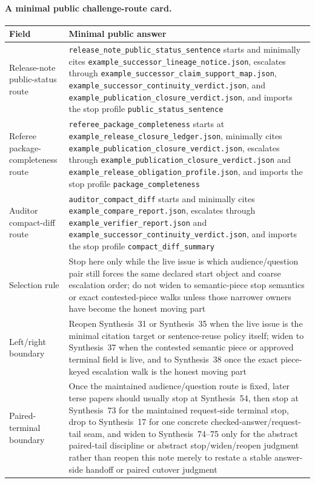 \documentclass[11pt]{article}
\begin{document}
\paragraph{A minimal public challenge-route card.}
\begin{table}[t]
\centering
\small
\begin{tabularx}{\linewidth}{@{}lX@{}}
\toprule
Field & Minimal public answer \\
\midrule
Release-note public-status route & \nolinkurl{release_note_public_status_sentence} starts and minimally cites \nolinkurl{example_successor_lineage_notice.json}, escalates through \nolinkurl{example_successor_claim_support_map.json}, \nolinkurl{example_successor_continuity_verdict.json}, and \nolinkurl{example_publication_closure_verdict.json}, and imports the stop profile \nolinkurl{public_status_sentence} \\
Referee package-completeness route & \nolinkurl{referee_package_completeness} starts at \nolinkurl{example_release_closure_ledger.json}, minimally cites \nolinkurl{example_publication_closure_verdict.json}, escalates through \nolinkurl{example_publication_closure_verdict.json} and \nolinkurl{example_release_obligation_profile.json}, and imports the stop profile \nolinkurl{package_completeness} \\
Auditor compact-diff route & \nolinkurl{auditor_compact_diff} starts and minimally cites \nolinkurl{example_compare_report.json}, escalates through \nolinkurl{example_verifier_report.json} and \nolinkurl{example_successor_continuity_verdict.json}, and imports the stop profile \nolinkurl{compact_diff_summary} \\
Selection rule & Stop here only while the live issue is which audience/question pair still forces the same declared start object and coarse escalation order; do not widen to semantic-piece stop semantics or exact contested-piece walks unless those narrower owners have become the honest moving part \\
Left/right boundary & Reopen Synthesis~31 or Synthesis~35 when the live issue is the minimal citation target or sentence-reuse policy itself; widen to Synthesis~37 when the contested semantic piece or approved terminal field is live, and to Synthesis~38 once the exact piece-keyed escalation walk is the honest moving part \\
Paired-terminal boundary & Once the maintained audience/question route is fixed, later terse papers should usually stop at Synthesis~54, then stop at Synthesis~73 for the maintained request-side terminal stop, drop to Synthesis~17 for one concrete checked-answer/request-tail seam, and widen to Synthesis~74--75 only for the abstract paired-tail discipline or abstract stop/widen/reopen judgment rather than reopen this note merely to restate a stable answer-side handoff or paired cutover judgment \\

\end{tabularx}
\end{table}
\end{document}
